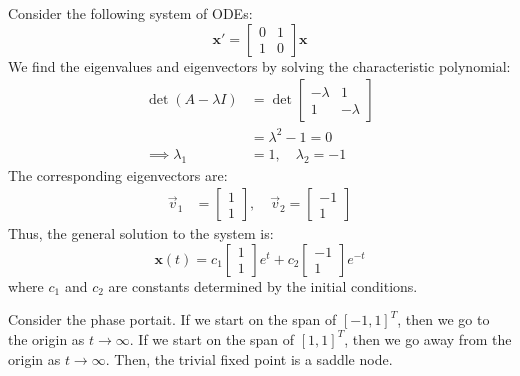 \documentclass[11pt]{article}
\begin{document}
\begin{example}
    Consider the following system of ODEs:
    $$
    \textbf{x}' = \begin{bmatrix} 0 & 1 \\ 1 & 0
    \end{bmatrix}\textbf{x}
    $$
    We find the eigenvalues and eigenvectors by solving the characteristic polynomial:
    \begin{align*}
    \det(A - \lambda I) &= \det\begin{bmatrix} -\lambda & 1 \\ 1 & -\lambda
    \end{bmatrix} \\
    &= \lambda^2 - 1 = 0 \\
    \implies \lambda_1 &= 1, \quad \lambda_2 = -1
    \end{align*}
    The corresponding eigenvectors are:
    \begin{align*}
    \vec{v}_1 &= \begin{bmatrix} 1 \\ 1
    \end{bmatrix}, \quad \vec{v}_2 = \begin{bmatrix} -1 \\ 1
    \end{bmatrix}
    \end{align*}
    Thus, the general solution to the system is:
    $$\textbf{x}(t) = c_1 \begin{bmatrix} 1 \\ 1
    \end{bmatrix} e^{t} + c_2 \begin{bmatrix} -1 \\ 1
    \end{bmatrix} e^{-t}$$
    where \( c_1 \) and \( c_2 \) are constants determined by the initial conditions.

    Consider the phase portait. If we start on the span of $ [-1, 1]^T$, then we go to the origin as $t \to \infty$. If we start on the span of $ [1, 1]^T$, then we go away from the origin as $t \to \infty$. Then, the trivial fixed point is a saddle node.
\end{example}
\end{document}

